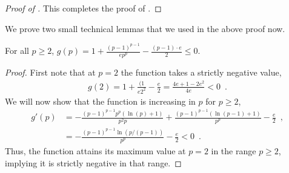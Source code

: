 \begin{proof}[Proof of ]
    This completes the proof of .
\end{proof}
We prove two small technical lemmas that we used in the above proof now. 
\begin{lemma}\label{lem:small_lemma_for_hessian_stability_one}
    For all $p\geq 2$, $g(p) = 1+\frac{(p-1)^{p-1}}{ep^p} - \frac{(p-1)\cdot e}{2} \leq 0$.
\end{lemma}
\begin{proof}
     First note that at $p=2$ the function takes a strictly negative value,
     \begin{align*}
         g(2) = 1+\frac{(1}{e2^2} - \frac{e}{2} = \frac{4e+ 1 - 2e^2}{4e} < 0\enspace. 
     \end{align*}
     We will now show that the function is increasing in $p$ for $p\geq 2$,
     \begin{align*}
         g'(p) &= -\frac{(p-1)^{p-1}p^p(\ln(p) + 1)}{p^2p} + \frac{(p-1)^{p-1}(\ln(p-1) + 1)}{p^p} - \frac{e}{2}\enspace,\\
         &= -\frac{(p-1)^{p-1}\ln(p/(p-1))}{p^p} - \frac{e}{2} < 0\enspace. 
     \end{align*}
     Thus, the function attains its maximum value at $p=2$ in the range $p\geq 2$, implying it is strictly negative in that range.
\end{proof}

